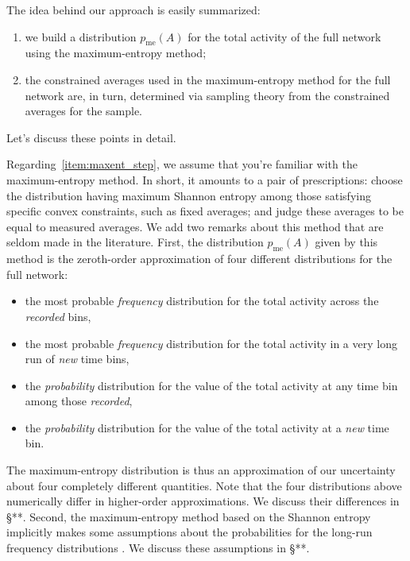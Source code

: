 \documentclass[\ifafour a4paper,12pt,\else a5paper,10pt,\fi%
onecolumn,oneside,article,%
british%
]{memoir}
\theoremstyle{remark}
\theoremstyle{innote}
\newcommand*{\citep}{\parencites}
\renewcommand*{\le}{\leqslant}%
\renewcommand*{\|}{\nonscript\,\vert\nonscript\;\mathopen{}}
\newcommand*{\sect}{\S}%
\newcommand*{\chap}{ch.}%
\newcommand*{\yAv}{A}
\newcommand*{\yFF}{F}
\newcommand*{\yA}{\yAv}%
\newcommand*{\yH}{\varIota}
\newcommand*{\ynuu}{\nu}
\newcommand*{\px}{p_{\text{me}}}
\begin{document}
\bigskip

The idea behind our approach is easily summarized:
\begin{enumerate}[label=(\alph*)]
  \item\label{item:maxent_step} we build a distribution $\px(\yA)$ for the total
  activity of the full network using the maximum-entropy method;
  \item\label{item:sample_step} the constrained averages used in the
  maximum-entropy method for the full network are, in turn, determined via
  sampling theory from the constrained averages for the sample.
\end{enumerate}
Let's discuss these points in detail.

Regarding~\ref{item:maxent_step}, we assume that you're familiar with the
maximum-entropy method. In short, it amounts to a pair of prescriptions:
choose the distribution having maximum Shannon entropy among those
satisfying specific convex constraints, such as fixed averages; and judge
these averages to be equal to measured averages. We add two remarks about
this method that are seldom made in the literature. First, the distribution
$\px(\yA)$ given by this method is the zeroth-order approximation \citep[in
the sense of Laplace's
method:][\chap~4]{debruijn1958_r1961}{tierneyetal1986,strawderman2000} of
four different distributions for the full network:
\begin{itemize}
\item the most probable \emph{frequency} distribution for the total
  activity across the \emph{recorded} bins, %
\item the most probable \emph{frequency} distribution for the total
  activity in a very long run of \emph{new} time bins, %
\item the \emph{probability} distribution for the value of the total
  activity at any time bin among those \emph{recorded},
\item the \emph{probability} distribution for the value of the total
  activity at a \emph{new} time bin.
\end{itemize}
The maximum-entropy distribution is thus an approximation of our
uncertainty about four completely different quantities. Note that the four
distributions above numerically differ in higher-order approximations. We
discuss their differences in \sect***. Second, the maximum-entropy method
based on the Shannon entropy implicitly makes some assumptions about the
probabilities for the long-run frequency distributions
\citep{jaynes1986d_r1996,portamana2009,portamana2017}. We discuss these
assumptions in \sect***.
\end{document}
